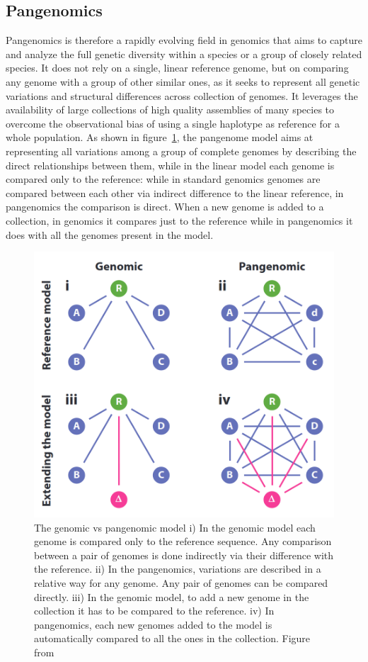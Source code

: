 \subsection{Pangenomics}
Pangenomics is therefore a rapidly evolving field in genomics that aims to capture and analyze the full genetic diversity within a species or a group of closely related species. It does not rely on a single, linear reference genome, but on comparing any genome with a group of other similar ones, as it seeks to represent all genetic variations and structural differences across collection of genomes. It leverages the availability of large collections of high quality assemblies of many species to overcome the observational bias of using a single haplotype as reference for a whole population. As shown in figure~\ref{fig:pangenomics_model}, the pangenome model aims at representing all variations among a group of complete genomes by describing the direct relationships between them, while in the linear model each genome is compared only to the reference: while in standard genomics genomes are compared between each other via indirect difference to the linear reference, in pangenomics the comparison is direct. When a new genome is added to a collection, in genomics it compares just to the reference while in pangenomics it does with all the genomes present in the model.
\begin{figure}[h!]
	\centering
	\includegraphics[width=.75\linewidth]{figures/background/pangenome_model.png}
	\caption[The Pangenome model.]{The genomic vs pangenomic model i) In the genomic model each genome is compared only to the reference sequence. Any comparison between a pair of genomes is done indirectly via their difference with the reference. ii) In the pangenomics, variations are described in a relative way for any genome. Any pair of genomes can be compared directly. iii) In the genomic model, to add a new genome in the collection it has to be compared to the reference. iv) In pangenomics, each new genomes added to the model is automatically compared to all the ones in the collection. Figure from~\cite{eizenga}\\}
	\label{fig:pangenomics_model}
\end{figure}
